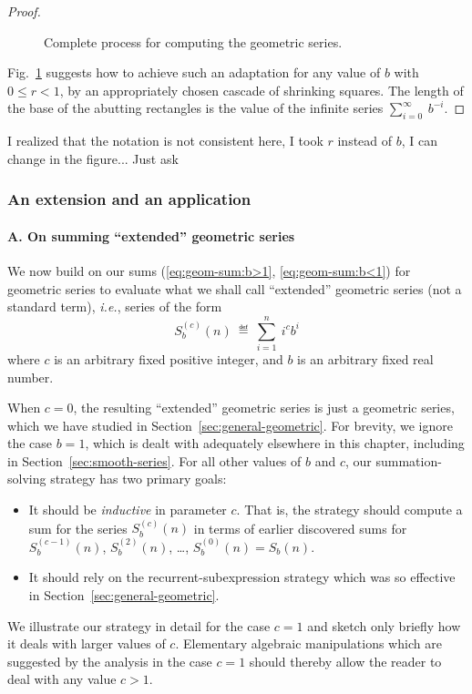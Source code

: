 \begin{proof}
\begin{figure}[h]
\begin{center}
\caption{Complete process for computing the geometric series.}
       \label{fig:sumGeoGeneral}
\end{center}
\end{figure}
Fig.~\ref{fig:sumGeoGeneral} suggests
how to achieve such an adaptation for any value of $b$ with $0 \leq r
<1$, by an appropriately chosen cascade of shrinking squares.  The
length of the base of the abutting rectangles is the value of the
infinite series $\displaystyle \sum_{i=0}^\infty \ b^{-i}$.
\end{proof}

{\Denis I realized that the notation is not consistent here, I took $r$ instead of $b$, I can change in the figure... Just ask}

\subsubsection{An extension and an application}

\paragraph{A. On summing ``extended'' geometric series}

We now build on our sums (\ref{eq:geom-sum:b>1},
\ref{eq:geom-sum:b<1}) for geometric series to evaluate what we shall
call ``extended'' geometric series (not a standard term), \textit{i.e.}, series
of the form
\[ S_b^{(c)}(n) \ \eqdef \ \sum_{i=1}^n \ i^c b^i \]
where $c$ is an arbitrary fixed positive integer, and $b$ is an
arbitrary fixed real number.

When $c=0$, the resulting ``extended'' geometric series is just a
geometric series, which we have studied in
Section~\ref{sec:general-geometric}.  For brevity, we ignore the case
$b = 1$, which is dealt with adequately elsewhere in this chapter,
including in Section~\ref{sec:smooth-series}.  For all other values of
$b$ and $c$, our summation-solving strategy has two primary goals:
\begin{itemize}
\item
It should be {\em inductive} in parameter $c$.  That is, the strategy
should compute a sum for the series $S_b^{(c)}(n)$ in terms of earlier
discovered sums for $S_b^{(c-1)}(n)$, $S_b^{(2)}(n)$, \ldots,
$S_b^{(0)}(n) = S_b(n)$.

\item
It should rely on the recurrent-subexpression strategy which was so
effective in Section~\ref{sec:general-geometric}.
\end{itemize}
We illustrate our strategy in detail for the case $c=1$ and sketch
only briefly how it deals with larger values of $c$.  Elementary
algebraic manipulations which are suggested by the analysis in the
case $c=1$ should thereby allow the reader to deal with any value $c >
1$.

